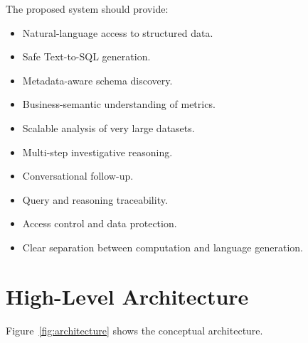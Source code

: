 \documentclass[11pt,a4paper]{article}
\begin{document}
The proposed system should provide:

\begin{itemize}[leftmargin=*]
    \item Natural-language access to structured data.
    \item Safe Text-to-SQL generation.
    \item Metadata-aware schema discovery.
    \item Business-semantic understanding of metrics.
    \item Scalable analysis of very large datasets.
    \item Multi-step investigative reasoning.
    \item Conversational follow-up.
    \item Query and reasoning traceability.
    \item Access control and data protection.
    \item Clear separation between computation and language generation.
\end{itemize}

\section{High-Level Architecture}

Figure~\ref{fig:architecture} shows the conceptual architecture.
\end{document}
